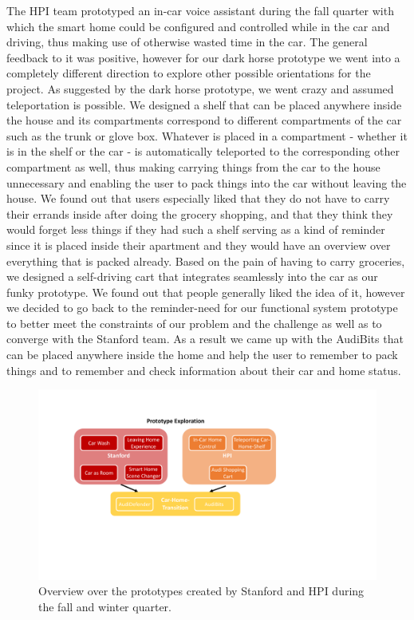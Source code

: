 The HPI team prototyped an in-car voice assistant during the fall quarter with which the smart home could be configured and controlled while in the car and driving, thus making use of otherwise wasted time in the car. The general feedback to it was positive, however for our dark horse prototype we went into a completely different direction to explore other possible orientations for the project. As suggested by the dark horse prototype, we went crazy and assumed teleportation is possible. We designed a shelf that can be placed anywhere inside the house and its compartments correspond to different compartments of the car such as the trunk or glove box. Whatever is placed in a compartment - whether it is in the shelf or the car - is automatically teleported to the corresponding other compartment as well, thus making carrying things from the car to the house unnecessary and enabling the user to pack things into the car without leaving the house. We found out that users especially liked that they do not have to carry their errands inside after doing the grocery shopping, and that they think they would forget less things if they had such a shelf serving as a kind of reminder since it is placed inside their apartment and they would have an overview over everything that is packed already. Based on the pain of having to carry groceries, we designed a self-driving cart that integrates seamlessly into the car as our funky prototype. We found out that people generally liked the idea of it, however we decided to go back to the reminder-need for our functional system prototype to better meet the constraints of our problem and the challenge as well as to converge with the Stanford team. As a result we came up with the AudiBits that can be placed anywhere inside the home and help the user to remember to pack things and to remember and check information about their car and home status.  

\begin{figure}
\centering
\includegraphics[width=5in]{Figures/Planning/Prototype_Overview}
	\caption{Overview over the prototypes created by Stanford and HPI during the fall and winter quarter.}
		\label{fig:prototype_overview}
\end{figure}


